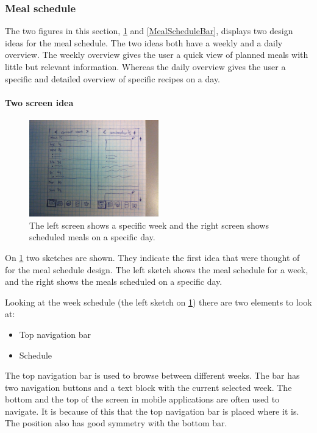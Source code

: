 \subsubsection{Meal schedule} \label{MealScheduleSketches}
The two figures in this section, \cref{MealScheduleList} and \cref{MealScheduleBar}, displays two design ideas for the meal schedule. The two ideas both have a weekly and a daily overview. The weekly overview gives the user a quick view of planned meals with little but relevant information. Whereas the daily overview gives the user a specific and detailed overview of specific recipes on a day.

\paragraph{Two screen idea} \label{FirstDraftWeekSchedule}

\begin{figure}[H]
	\centering
    \includegraphics[width=0.5\textwidth]{Grafik/FoodPlanner/FinalMealScheduleSketch1}
	\caption{The left screen shows a specific week and the right screen shows scheduled meals on a specific day.}
	\label{MealScheduleList}
\end{figure}

On \cref{MealScheduleList} two sketches are shown. They indicate the first idea that were thought of for the meal schedule design. The left sketch shows the meal schedule for a week, and the right shows the meals scheduled on a specific day.

Looking at the week schedule (the left sketch on \cref{MealScheduleList}) there are two elements to look at:

\begin{itemize}
    \item Top navigation bar
    \item Schedule
\end{itemize}

The top navigation bar is used to browse between different weeks. The bar has two navigation buttons and a text block with the current selected week. The bottom and the top of the screen in mobile applications are often used to navigate. It is because of this that the top navigation bar is placed where it is. The position also has good symmetry with the bottom bar.

